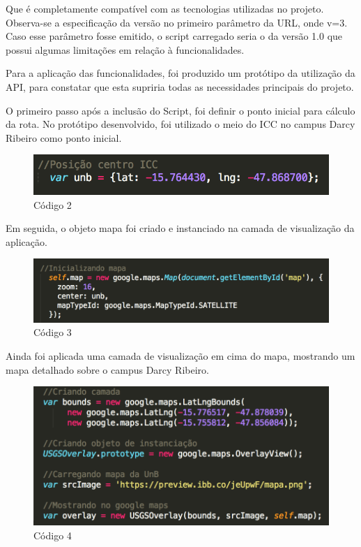 Que é completamente compatível com as tecnologias utilizadas no projeto. Observa-se a especificação da versão no primeiro parâmetro da URL, onde v=3. Caso esse parâmetro fosse emitido, o script carregado seria o da versão 1.0 que possui algumas limitações em relação à funcionalidades.

Para a aplicação das funcionalidades, foi produzido um protótipo da utilização da API, para constatar que esta supriria todas as necessidades principais do projeto.

O primeiro passo após a inclusão do Script, foi definir o ponto inicial para cálculo da rota. No protótipo desenvolvido, foi utilizado o meio do ICC no campus Darcy Ribeiro como ponto inicial.

\graphicspath{{figuras/}}
\begin{figure}[h!]
\centering
\includegraphics[scale=0.80]{codigo2}
\caption{Código 2}
\label{img:codigo2}
\end{figure}

Em seguida, o objeto mapa foi criado e instanciado na camada de visualização da aplicação.	
	
\graphicspath{{figuras/}}
\begin{figure}[h!]
\centering
\includegraphics[scale=0.80]{codigo3}
\caption{Código 3}
\label{img:codigo3}
\end{figure}

Ainda foi aplicada uma camada de visualização em cima do mapa, mostrando um mapa detalhado sobre o campus Darcy Ribeiro.

\graphicspath{{figuras/}}
\begin{figure}[h!]
\centering
\includegraphics[scale=0.80]{codigo4}
\caption{Código 4}
\label{img:codigo4}
\end{figure}

